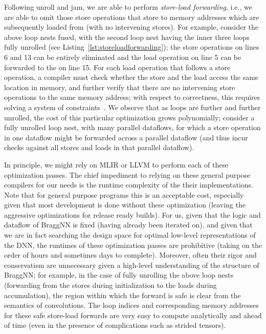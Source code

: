 Following unroll and jam, we are able to perform \emph{store-load forwarding}, i.e., we are able to omit those store operations that store to memory addresses which are subsequently loaded from (with no intervening stores).
For example, consider the above loop nests fused, with the second loop nest having the inner three loops fully unrolled (see Listing~\ref{lst:storeloadforwarding}); the store operations on lines 6 and 13 can be entirely eliminated and the load operation on line 5 can be forwarded to the  on line 15.
For each load operation that follows a store operation, a compiler must check whether the store and the load access the same location in memory, and further verify that there are no intervening store operations to the same memory address;
with respect to correctness, this requires solving a system of constraints~\cite{10.2307/2322281}.
We observe that as loops are further and further unrolled, the cost of this particular optimization grows polynomially; consider a fully unrolled loop nest, with many parallel dataflows, for which a store operation in one dataflow might be forwarded across a parallel dataflow (and thus incur checks against all stores and loads in that parallel dataflow).

In principle, we might rely on MLIR or LLVM to perform each of these optimization passes.
The chief impediment to relying on these general purpose compilers for our needs is the runtime complexity of the their implementations.
Note that for general purpose programs this is an acceptable cost, especially given that most development is done without these optimization (leaving the aggressive optimizations for release ready builds).
For us, given that the logic and dataflow of BraggNN is fixed (having already been iterated on), and given that we are in fact searching the design space for optimal low-level representations of the DNN, the runtimes of these optimization passes are prohibitive (taking on the order of hours and sometimes days to complete).
Moreover, often their rigor and conservatism are unnecessary given a high-level understanding of the structure of BraggNN; for example, in the case of fully unrolling the above loop nests (forwarding from the stores during initialization to the loads during accumulation), the region within which the forward is safe is clear from the semantics of convolutions.
The loop indices and corresponding memory addresses for these safe store-load forwards are very easy to compute analytically and ahead of time (even in the presence of complications such as strided tensors).

